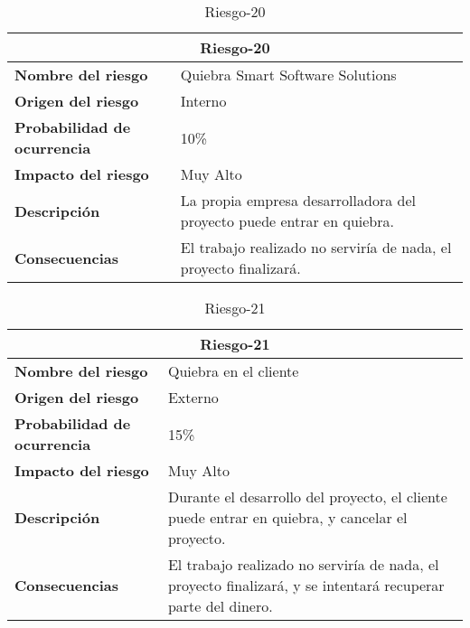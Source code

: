 \begin{table}[H]
\begin{center}
\begin{tabular}{p{} p{7cm}}
\multicolumn{2}{c}{\textbf{Riesgo-20} } \\
\hline \hline
\textbf{Nombre del riesgo} &  Quiebra Smart Software Solutions\\
\hline
\textbf{Origen del riesgo} & Interno\\
\hline
\textbf{Probabilidad de ocurrencia} &  10\% \\
\hline
\textbf{Impacto del riesgo} &  Muy Alto \\
\hline
\textbf{Descripción} &  La propia empresa desarrolladora del proyecto puede entrar en quiebra.  \\
\hline
\textbf{Consecuencias} & El trabajo realizado no serviría de nada, el proyecto finalizará.   \\
\hline
\end{tabular}
\caption{Riesgo-20}
\label{tab:Riesgo-20}
\end{center}
\end{table}

\begin{table}[H]
\begin{center}
\begin{tabular}{p{} p{7cm}}
\multicolumn{2}{c}{\textbf{Riesgo-21} } \\
\hline \hline
\textbf{Nombre del riesgo} & Quiebra en el cliente \\
\hline
\textbf{Origen del riesgo} & Externo\\
\hline
\textbf{Probabilidad de ocurrencia} &  15\% \\
\hline
\textbf{Impacto del riesgo} &  Muy Alto \\
\hline
\textbf{Descripción} & Durante el desarrollo del proyecto, el cliente puede entrar en quiebra, y cancelar el proyecto.   \\
\hline
\textbf{Consecuencias} &  El trabajo realizado no serviría de nada, el proyecto finalizará, y se intentará recuperar parte del dinero.  \\
\hline
\end{tabular}
\caption{Riesgo-21}
\label{tab:Riesgo-21}
\end{center}
\end{table}


